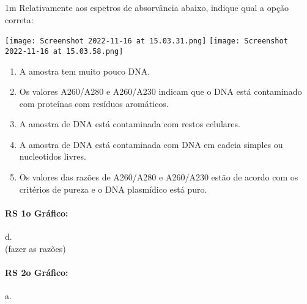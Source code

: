 \documentclass[\mainfilename]{subfiles}
\begin{document}
\begin{questionBox}1m{ %
    Relativamente aos espetros de absorvância abaixo, indique qual a opção correta:
} %
    
    \begin{center}
        \texttt{[image: Screenshot 2022-11-16 at 15.03.31.png]}
        \texttt{[image: Screenshot 2022-11-16 at 15.03.58.png]}
    \end{center}
    
    \begin{enumerate}[label=\alph{enumi}.]
        \item A amostra tem muito pouco DNA.
        \item Os valores A260/A280 e A260/A230 indicam que o DNA está contaminado com proteínas com resíduos aromáticos.
        \item A amostra de DNA está contaminada com restos celulares.
        \item A amostra de DNA está contaminada com DNA em cadeia simples ou nucleotidos livres. 
        \item Os valores das razões de A260/A280 e A260/A230 estão de acordo com os critérios de pureza e o DNA plasmídico está puro.
    \end{enumerate}

    \begin{answerBox}{} %
        \begin{multicols}{2}
            \paragraph*{RS 1o Gráfico:} d.\\(fazer as razões)
            \paragraph*{RS 2o Gráfico:} a.
        \end{multicols}
    \end{answerBox}

\end{questionBox}
\end{document}
